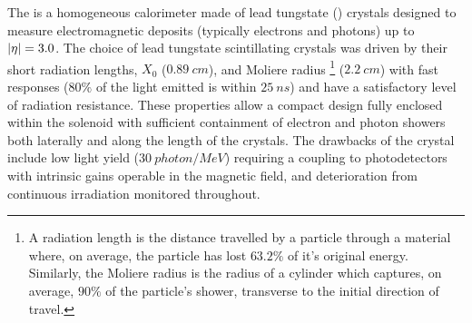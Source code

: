 The \ECAL is a homogeneous calorimeter made of lead tungstate (\pbwo) crystals
designed to measure electromagnetic deposits (typically electrons and photons)
up to ${|\eta|=3.0}$. The choice of lead tungstate scintillating crystals was
driven by their short radiation lengths, $X_0$ (${\SI{0.89}{cm}}$), and
Moliere radius \footnote{A radiation length is the distance travelled by a
particle through a material where, on average, the particle has lost $63.2\%$
of it's original energy. Similarly, the Moliere radius is the radius of a
cylinder which captures, on average, $90\%$ of the particle's shower,
transverse to the initial direction of travel.} (${\SI{2.2}{cm}}$) with fast
responses ($80\%$ of the light emitted is within ${\SI{25}{ns}}$) and have a
satisfactory level of radiation resistance. These properties allow a compact
design fully enclosed within the solenoid with sufficient containment of
electron and photon showers both laterally and along the length of the
crystals. The drawbacks of the crystal include low light yield
(${\SI{30}{photon/MeV}}$) requiring a coupling to photodetectors with
intrinsic gains operable in the magnetic field, and deterioration from
continuous irradiation monitored throughout.

